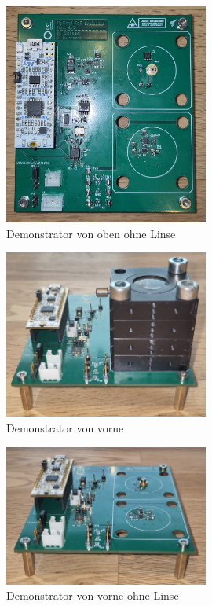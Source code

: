 \begin{figure}[H]
    \centering
    \includegraphics[width=0.6\textwidth]{graphics/photo_demonstrator_top_wo_lens.jpg}
    \caption{Demonstrator von oben ohne Linse}\label{fig:apdx_photo_demonstrator_top_wo_lens}
\end{figure}

\begin{figure}[H]
    \centering
    \includegraphics[width=0.6\textwidth]{graphics/photo_demonstrator_front.jpg}
    \caption{Demonstrator von vorne}\label{fig:apdx_photo_demonstrator_front}
\end{figure}

\begin{figure}[H]
    \centering
    \includegraphics[width=0.6\textwidth]{graphics/photo_demonstrator_front_wo_lens.jpg}
    \caption{Demonstrator von vorne ohne Linse}\label{fig:apdx_photo_demonstrator_front_wo_lens}
\end{figure}

